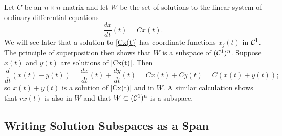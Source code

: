 \documentclass{ximera}
\begin{document}
Let $C$ be an $n\times n$ matrix and let $W$ be the set of solutions to
the linear system of ordinary differential equations
\begin{equation} \label{Cx(t)}
\frac{dx}{dt}(t) = Cx(t).
\end{equation}
We will see later that a solution to \eqref{Cx(t)} has coordinate
functions $x_j(t)$ in ${\cal C}^1$.  The principle of superposition
then shows that $W$ is a subspace of $({\cal C}^1)^n$.  Suppose
$x(t)$ and $y(t)$ are solutions of \eqref{Cx(t)}.  Then
\[
\frac{d}{dt}(x(t)+y(t)) = \frac{dx}{dt}(t) + \frac{dy}{dt}(t) =
Cx(t) + Cy(t) = C(x(t)+y(t));
\]
so $x(t)+y(t)$ is a solution of \eqref{Cx(t)} and in $W$.  A
similar calculation shows that $rx(t)$ is also in $W$ and
that $W\subset({\cal C}^1)^n$ is a subspace.


\subsection*{Writing Solution Subspaces as a Span}
\end{document}
